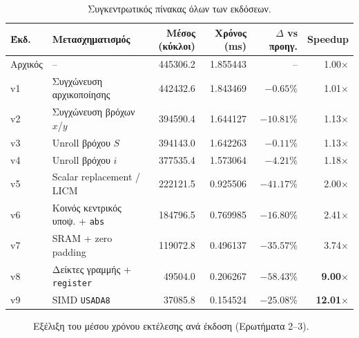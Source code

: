 \documentclass[11pt,a4paper]{article}
\newcommand{\code}[1]{\texttt{#1}}
\newcommand{\en}[1]{\foreignlanguage{english}{#1}}
\begin{document}
\begin{table}[H]
\centering
\caption{Συγκεντρωτικός πίνακας όλων των εκδόσεων.}
\label{tab:summary}
\small
\begin{tabular}{@{}llrrrr@{}}
\toprule
\textbf{Έκδ.} & \textbf{Μετασχηματισμός} & \textbf{Μέσος (κύκλοι)} & \textbf{Χρόνος (ms)} & \textbf{$\Delta$ vs προηγ.} & \textbf{Speedup} \\
\midrule
Αρχικός & -- & \num{445306.2} & \num{1.855443} & -- & 1.00$\times$ \\
v1 & Συγχώνευση αρχικοποίησης & \num{442432.6} & \num{1.843469} & $-0.65\%$ & 1.01$\times$ \\
v2 & Συγχώνευση βρόχων $x$/$y$ & \num{394590.4} & \num{1.644127} & $-10.81\%$ & 1.13$\times$ \\
v3 & \en{Unroll} βρόχου $S$ & \num{394143.0} & \num{1.642263} & $-0.11\%$ & 1.13$\times$ \\
v4 & \en{Unroll} βρόχου $i$ & \num{377535.4} & \num{1.573064} & $-4.21\%$ & 1.18$\times$ \\
v5 & \en{Scalar replacement} / \en{LICM} & \num{222121.5} & \num{0.925506} & $-41.17\%$ & 2.00$\times$ \\
v6 & Κοινός κεντρικός υποψ. + \code{abs} & \num{184796.5} & \num{0.769985} & $-16.80\%$ & 2.41$\times$ \\
v7 & SRAM + \en{zero padding} & \num{119072.8} & \num{0.496137} & $-35.57\%$ & 3.74$\times$ \\
v8 & Δείκτες γραμμής + \code{register} & \num{49504.0} & \num{0.206267} & $-58.43\%$ & \textbf{9.00$\times$} \\
v9 & SIMD \code{USADA8} & \num{37085.8} & \num{0.154524} & $-25.08\%$ & \textbf{12.01$\times$} \\
\bottomrule
\end{tabular}
\end{table}

\begin{figure}[H]
\centering
{}
\caption{Εξέλιξη του μέσου χρόνου εκτέλεσης ανά έκδοση (Ερωτήματα 2--3).}
\label{fig:versions}
\end{figure}
\end{document}
